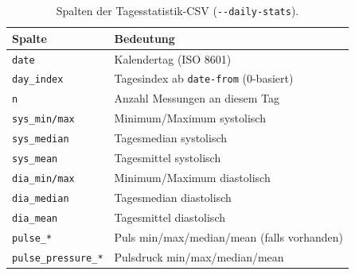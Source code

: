 \documentclass[conference]{IEEEtran}
\begin{document}
\begin{table}[!t]
\caption{Spalten der Tagesstatistik-CSV (\texttt{-{}-daily-stats}).}
\label{tab:daily_cols}
\centering
\footnotesize
\renewcommand{\arraystretch}{1.15}
\begin{tabular}{>{\raggedright\arraybackslash}p{} >{\raggedright\arraybackslash}p{}}
\toprule
\textbf{Spalte} & \textbf{Bedeutung} \\
\midrule
\texttt{date} & Kalendertag (ISO 8601) \\
\texttt{day\_index} & Tagesindex ab \texttt{date-from} (0-basiert) \\
\texttt{n} & Anzahl Messungen an diesem Tag \\
\texttt{sys\_min/max} & Minimum/Maximum systolisch \\
\texttt{sys\_median} & Tagesmedian systolisch \\
\texttt{sys\_mean} & Tagesmittel systolisch \\
\texttt{dia\_min/max} & Minimum/Maximum diastolisch \\
\texttt{dia\_median} & Tagesmedian diastolisch \\
\texttt{dia\_mean} & Tagesmittel diastolisch \\
\texttt{pulse\_*} & Puls min/max/median/mean (falls vorhanden) \\
\texttt{pulse\_pressure\_*} & Pulsdruck min/max/median/mean \\
\bottomrule
\end{tabular}
\end{table}
\end{document}
